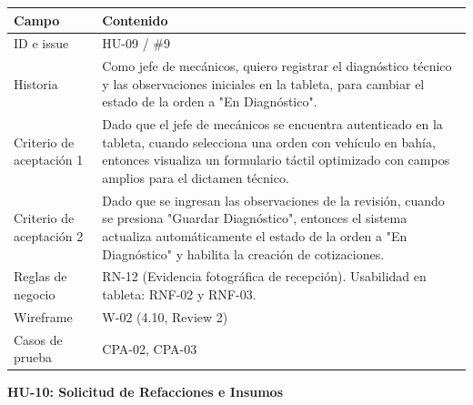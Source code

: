 {\def\LTcaptype{none} %
\begin{longtable}[]{@{}
  >{\raggedright\arraybackslash}p{}
  >{\raggedright\arraybackslash}p{}@{}}
\toprule\noalign{}
\begin{minipage}[b]{\linewidth}\raggedright
\textbf{Campo}
\end{minipage} & \begin{minipage}[b]{\linewidth}\raggedright
\textbf{Contenido}
\end{minipage} \\
\midrule\noalign{}
\endhead
\bottomrule\noalign{}
\endlastfoot
ID e issue & HU-09 / \#9 \\
Historia & Como jefe de mecánicos, quiero registrar el diagnóstico
técnico y las observaciones iniciales en la tableta, para cambiar el
estado de la orden a "En Diagnóstico". \\
Criterio de aceptación 1 & Dado que el jefe de mecánicos se encuentra
autenticado en la tableta, cuando selecciona una orden con vehículo en
bahía, entonces visualiza un formulario táctil optimizado con campos
amplios para el dictamen técnico. \\
Criterio de aceptación 2 & Dado que se ingresan las observaciones de la
revisión, cuando se presiona "Guardar Diagnóstico", entonces el sistema
actualiza automáticamente el estado de la orden a "En Diagnóstico" y
habilita la creación de cotizaciones. \\
Reglas de negocio & RN-12 (Evidencia fotográfica de recepción).
Usabilidad en tableta: RNF-02 y RNF-03. \\
Wireframe & W-02 (4.10, Review 2) \\
Casos de prueba & CPA-02, CPA-03 \\
\end{longtable}
}

\textbf{HU-10: Solicitud de Refacciones e Insumos}

